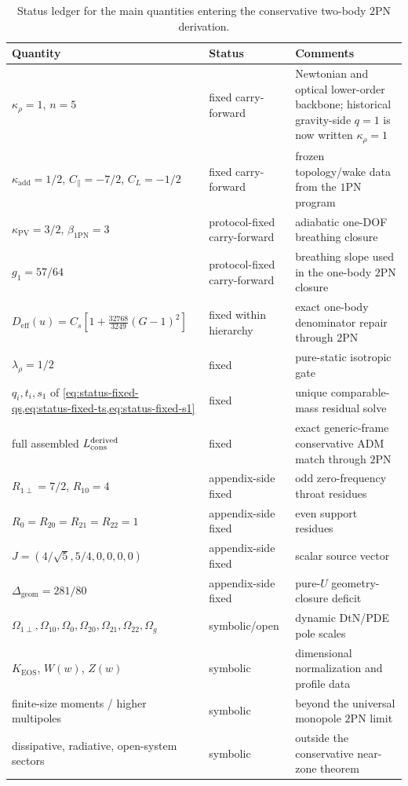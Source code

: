 \documentclass[11pt]{article}
\newcommand{\OnePN}{\mathrm{1PN}}
\newcommand{\TwoPN}{\mathrm{2PN}}
\newcommand{\ADM}{\mathrm{ADM}}
\newcommand{\DtN}{\mathrm{DtN}}
\newcommand{\eff}{\mathrm{eff}}
\newcommand{\geom}{\mathrm{geom}}
\newcommand{\Wproj}{W}
\newcommand{\Zloc}{Z}
\newcommand{\kadd}{\kappa_{\mathrm{add}}}
\newcommand{\kPV}{\kappa_{\mathrm{PV}}}
\newcommand{\krho}{\kappa_{\rho}}
\newcommand{\KEOS}{K_{\mathrm{EOS}}}
\begin{document}
\begin{table}[H]
  \centering
  \caption{Status ledger for the main quantities entering the conservative two-body
  \(\TwoPN\) derivation.}
  \label{tab:status-ledger-2pn}
  \small
  \renewcommand{\arraystretch}{1.15}
  \begin{tabularx}{\linewidth}{@{}L L L@{}}
    \toprule
    Quantity & Status & Comments \\
    \midrule
    \(\krho=1\), \(n=5\) & fixed carry-forward & Newtonian and optical lower-order backbone; historical gravity-side \(q=1\) is now written \(\krho=1\) \\
    \(\kadd=1/2\), \(C_\parallel=-7/2\), \(C_L=-1/2\) & fixed carry-forward & frozen topology/wake data from the \(\OnePN\) program \\
    \(\kPV=3/2\), \(\beta_{\OnePN}=3\) & protocol-fixed carry-forward & adiabatic one-DOF breathing closure \\
    \(g_1=57/64\) & protocol-fixed carry-forward & breathing slope used in the one-body \(\TwoPN\) closure \\
    \(D_{\eff}(u)=C_s[1+\tfrac{32768}{3249}(G-1)^2]\) & fixed within hierarchy & exact one-body denominator repair through \(\TwoPN\) \\
    \(\lambda_\rho=1/2\) & fixed & pure-static isotropic gate \\
    \(q_i,t_i,s_1\) of \cref{eq:status-fixed-qs,eq:status-fixed-ts,eq:status-fixed-s1} & fixed & unique comparable-mass residual solve \\
    full assembled \(L_{\rm cons}^{\rm derived}\) & fixed & exact generic-frame conservative \(\ADM\) match through \(\TwoPN\) \\
    \(R_{1\perp}=7/2\), \(R_{10}=4\) & appendix-side fixed & odd zero-frequency throat residues \\
    \(R_0=R_{20}=R_{21}=R_{22}=1\) & appendix-side fixed & even support residues \\
    \(J=(4/\sqrt5,5/4,0,0,0,0)\) & appendix-side fixed & scalar source vector \\
    \(\Delta_{\geom}=281/80\) & appendix-side fixed & pure-\(U\) geometry-closure deficit \\
    \(\Omega_{1\perp},\Omega_{10},\Omega_0,\Omega_{20},\Omega_{21},\Omega_{22},\Omega_g\) & symbolic/open & dynamic \(\DtN\)/PDE pole scales \\
    \(\KEOS\), \(\Wproj(w)\), \(\Zloc(w)\) & symbolic & dimensional normalization and profile data \\
    finite-size moments / higher multipoles & symbolic & beyond the universal monopole \(\TwoPN\) limit \\
    dissipative, radiative, open-system sectors & symbolic & outside the conservative near-zone theorem \\
    \bottomrule
  \end{tabularx}
\end{table}
\end{document}
